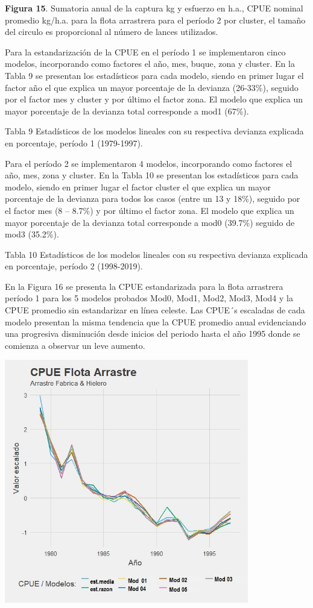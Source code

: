 \documentclass[
  spanish,
]{article}
\begin{document}
\small \textbf{Figura 15}. Sumatoria anual de la captura kg y esfuerzo
en h.a., CPUE nominal promedio kg/h.a. para la flota arrastrera para el
período 2 por cluster, el tamaño del circulo es proporcional al número
de lances utilizados. \vspace{0.5cm} \normalsize

Para la estandarización de la CPUE en el período 1 se implementaron
cinco modelos, incorporando como factores el año, mes, buque, zona y
cluster. En la Tabla 9 se presentan los estadísticos para cada modelo,
siendo en primer lugar el factor año el que explica un mayor porcentaje
de la devianza (26-33\%), seguido por el factor mes y cluster y por
último el factor zona. El modelo que explica un mayor porcentaje de la
devianza total corresponde a mod1 (67\%).

Tabla 9 Estadísticos de los modelos lineales con su respectiva devianza
explicada en porcentaje, período 1 (1979-1997).

Para el período 2 se implementaron 4 modelos, incorporando como factores
el año, mes, zona y cluster. En la Tabla 10 se presentan los
estadísticos para cada modelo, siendo en primer lugar el factor cluster
el que explica un mayor porcentaje de la devianza para todos los casos
(entre un 13 y 18\%), seguido por el factor mes (8 -- 8.7\%) y por
último el factor zona. El modelo que explica un mayor porcentaje de la
devianza total corresponde a mod0 (39.7\%) seguido de mod3 (35.2\%).

Tabla 10 Estadísticos de los modelos lineales con su respectiva devianza
explicada en porcentaje, período 2 (1998-2019).

En la Figura 16 se presenta la CPUE estandarizada para la flota
arrastrera período 1 para los 5 modelos probados Mod0, Mod1, Mod2, Mod3,
Mod4 y la CPUE promedio sin estandarizar en línea celeste. Las CPUE´s
escaladas de cada modelo presentan la misma tendencia que la CPUE
promedio anual evidenciando una progresiva disminución desde inicios del
periodo hasta el año 1995 donde se comienza a observar un leve aumento.

\begin{center}
\includegraphics[width=0.8\textwidth]{Figuras/Figura_16.png}
\end{center}
\end{document}
